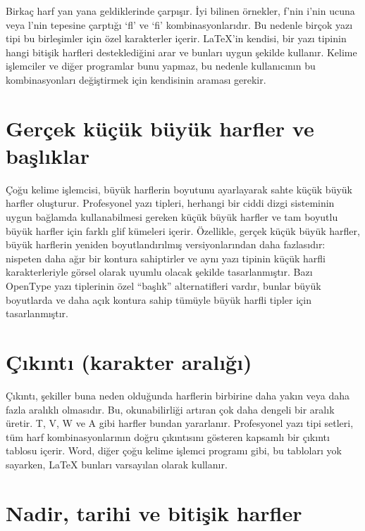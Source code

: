\documentclass[
  10pt,
]{scrbook}
\begin{document}
Birkaç harf yan yana geldiklerinde çarpışır. İyi bilinen örnekler, f'nin
i'nin ucuna veya l'nin tepesine çarptığı `fl' ve `fi'
kombinasyonlarıdır. Bu nedenle birçok yazı tipi bu birleşimler için özel
karakterler içerir. LaTeX'in kendisi, bir yazı tipinin hangi bitişik
harfleri desteklediğini arar ve bunları uygun şekilde kullanır. Kelime
işlemciler ve diğer programlar bunu yapmaz, bu nedenle kullanıcının bu
kombinasyonları değiştirmek için kendisinin araması gerekir.

\hypertarget{geruxe7ek-kuxfcuxe7uxfck-buxfcyuxfck-harfler-ve-baux15flux131klar}{%
\section{Gerçek küçük büyük harfler ve başlıklar}\label{geruxe7ek-kuxfcuxe7uxfck-buxfcyuxfck-harfler-ve-baux15flux131klar}}

Çoğu kelime işlemcisi, büyük harflerin boyutunu ayarlayarak sahte küçük
büyük harfler oluşturur. Profesyonel yazı tipleri, herhangi bir ciddi
dizgi sisteminin uygun bağlamda kullanabilmesi gereken küçük büyük
harfler ve tam boyutlu büyük harfler için farklı glif kümeleri içerir.
Özellikle, gerçek küçük büyük harfler, büyük harflerin yeniden
boyutlandırılmış versiyonlarından daha fazlasıdır: nispeten daha ağır
bir kontura sahiptirler ve aynı yazı tipinin küçük harfli
karakterleriyle görsel olarak uyumlu olacak şekilde tasarlanmıştır. Bazı
OpenType yazı tiplerinin özel ``başlık'' alternatifleri vardır, bunlar
büyük boyutlarda ve daha açık kontura sahip tümüyle büyük harfli tipler
için tasarlanmıştır.

\hypertarget{uxe7ux131kux131ntux131-karakter-aralux131ux11fux131}{%
\section{Çıkıntı (karakter aralığı)}\label{uxe7ux131kux131ntux131-karakter-aralux131ux11fux131}}

Çıkıntı, şekiller buna neden olduğunda harflerin birbirine daha yakın
veya daha fazla aralıklı olmasıdır. Bu, okunabilirliği artıran çok daha
dengeli bir aralık üretir. T, V, W ve A gibi harfler bundan yararlanır.
Profesyonel yazı tipi setleri, tüm harf kombinasyonlarının doğru
çıkıntısını gösteren kapsamlı bir çıkıntı tablosu içerir. Word, diğer
çoğu kelime işlemci programı gibi, bu tabloları yok sayarken, LaTeX
bunları varsayılan olarak kullanır.

\hypertarget{nadir-tarihi-ve-bitiux15fik-harfler}{%
\section{Nadir, tarihi ve bitişik harfler}\label{nadir-tarihi-ve-bitiux15fik-harfler}}
\end{document}
